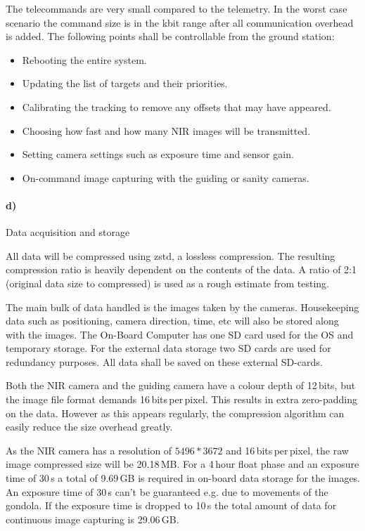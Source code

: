 \newpage
The telecommands are very small compared to the telemetry. In the worst case scenario the command size is in the kbit range after all communication overhead is added. The following points shall be controllable from the ground station:

\begin{itemize}
	\item Rebooting the entire system.
	\item Updating the list of targets and their priorities.
	\item Calibrating the tracking to remove any offsets that may have appeared.
	\item Choosing how fast and how many NIR images will be transmitted.
	\item Setting camera settings such as exposure time and sensor gain.
	\item On-command image capturing with the guiding or sanity cameras.
\end{itemize}













\paragraph{d)} Data acquisition and storage

All data will be compressed using zstd, a lossless compression. The resulting compression ratio is heavily dependent on the contents of the data. A ratio of 2:1 (original data size to compressed) is used as a rough estimate from testing.

The main bulk of data handled is the images taken by the cameras. Housekeeping data such as positioning, camera direction, time, etc will also be stored along with the images. The On-Board Computer has one SD card used for the OS and temporary storage. For the external data storage two SD cards are used for redundancy purposes. All data shall be saved on these external SD-cards.

Both the NIR camera and the guiding camera have a colour depth of 12\,bits, but the image file format demands 16\,bits\,per\,pixel. This results in extra zero-padding on the data. However as this appears regularly, the compression algorithm can easily reduce the size overhead greatly.

As the NIR camera has a resolution of $5496 * 3672$ and 16\,bits\,per\,pixel, the raw image compressed size will be 20.18\,MB. For a 4\,hour float phase and an exposure time of 30\,s a total of  9.69\,GB is required in on-board data storage for the images. An exposure time of 30\,s can't be guaranteed e.g. due to movements of the gondola. If the exposure time is dropped to 10\,s the total amount of data for continuous image capturing is  29.06\,GB.

